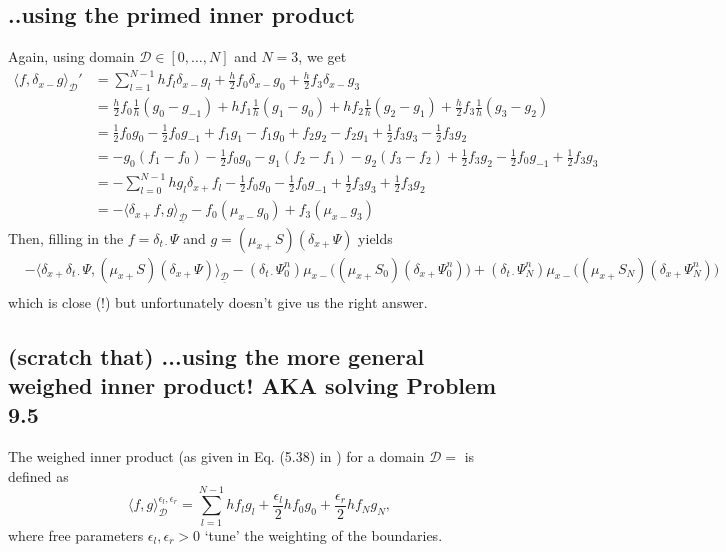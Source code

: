 \documentclass[dvipsnames]{article}
\def\dxp{\delta_{x+}}
\def\dxm{\delta_{x-}}
\def\mup{\mu_{x+}}
\def\mum{\mu_{x-}}
\def\dtd{\delta_{t\cdot}}
\begin{document}
\subsection{..using the primed inner product}
Again, using domain $\mathcal{D} \in [0, \hdots, N]$ and $N = 3$, we get
\begin{equation}
\begin{aligned}
    \langle f, \dxm g\rangle_\mathcal{D}' &= \sum_{l=1}^{N-1} hf_l\dxm g_l + \frac{h}{2}f_0\dxm g_0 + \frac{h}{2}f_3\dxm g_3\\
    &= \frac{h}{2}f_0\frac{1}{h}(g_0-g_{-1})+hf_1\frac{1}{h}(g_1-g_0)+ hf_2\frac{1}{h}(g_2-g_1)+ \frac{h}{2}f_3\frac{1}{h}(g_3-g_{2})\\
    &= \frac{1}{2}f_0g_0-\frac{1}{2}f_0g_{-1}+f_1g_1-f_1g_0+f_2g_2-f_2g_1+\frac{1}{2}f_3g_3-\frac{1}{2}f_3g_2\\
    &= -g_0(f_1-f_0) - \frac{1}{2}f_0g_0-g_1(f_2-f_1)-g_2(f_3-f_2) + \frac{1}{2}f_3g_2-\frac{1}{2}f_0g_{-1}+\frac{1}{2}f_3g_3\\
    &= -\sum_{l=0}^{N-1}hg_l\dxp f_l - \frac{1}{2}f_0g_0-\frac{1}{2}f_0g_{-1}+\frac{1}{2}f_3g_3+\frac{1}{2}f_3g_2\\
    &= -\langle \dxp f, g \rangle_{\underline{\mathcal{D}}}-f_0(\mum g_0)+f_3(\mum g_3)
\end{aligned}
    \end{equation}
Then, filling in the $f=\dtd\Psi$ and $g = (\mup S)(\dxp \Psi)$ yields
\begin{equation}
    \begin{aligned}
        &-\langle \dxp \dtd\Psi, (\mup S)(\dxp \Psi)\rangle_\mathcal{\underline{D}} - (\dtd\Psi_0^n)\mum\big((\mup S_0)(\dxp \Psi_0^n)\big) + (\dtd\Psi_N^n)\mum\big((\mup S_N)(\dxp \Psi_N^n)\big)\\
    \end{aligned}
\end{equation}
which is close (!) but unfortunately doesn't give us the right answer. 

\subsection{(scratch that) ...using the more general weighed inner product! AKA solving Problem 9.5}
The weighed inner product (as given in Eq. (5.38) in \cite{Bilbao2009}) for a domain $\mathcal{D} = $ is defined as
\begin{equation}
    \langle f,g \rangle_{\mathcal{D}}^{\epsilon_l, \epsilon_r}= \sum_{l = 1}^{N-1}hf_lg_l + \frac{\epsilon_l}{2}hf_0g_0 + \frac{\epsilon_r}{2}hf_Ng_N,
\end{equation}
where free parameters $\epsilon_l, \epsilon_r > 0$ `tune' the weighting of the boundaries.
\end{document}
